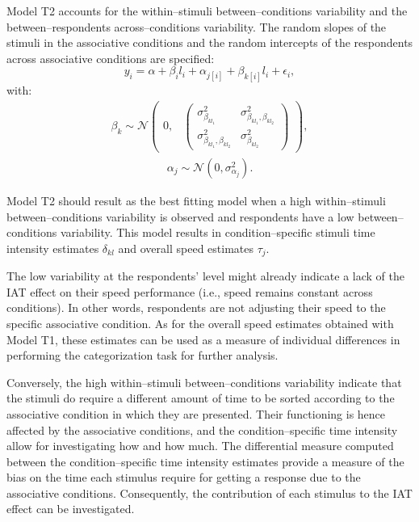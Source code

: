 \documentclass{book}
\begin{document}
Model T2 accounts for the within--stimuli between--conditions variability and the between--respondents across--conditions variability. 
The random slopes of the stimuli in the associative conditions and the random intercepts of the respondents across associative conditions are specified:  
%
\begin{equation}\label{Logtime2}
	y_{i} = \alpha + \beta_il_i + \alpha_{j[i]} +  \beta_{k[i]}l_{i} + \epsilon_{i},
\end{equation}
with:
\begin{align}
	\beta_{k} \sim  \mathcal{N}
	\begin{pmatrix}
		0,&
		\begin{pmatrix}
			\sigma_{\beta_{kl_1}}^2 & \sigma_{\beta_ {kl_1}, \beta_{kl_2}}^2 \\
			\sigma_{{\beta_{kl_1}}, \beta_{kl_2}}^2& \sigma_{\beta_{kl_2}}^2
		\end{pmatrix}
	\end{pmatrix},
\end{align}
\begin{align}
	\alpha_{j} \sim  \mathcal{N} (0, \sigma_{\alpha_j}^2). 
\end{align}

Model T2 should result as the best fitting model when a high within--stimuli between--conditions variability is observed and respondents have a low between--conditions variability. This model results in condition--specific stimuli time intensity estimates $\delta_{kl}$ and overall speed estimates $\tau_{j}$.

The low variability at the respondents' level might already indicate a lack of the IAT effect on their speed performance (i.e., speed remains constant across conditions). In other words, respondents are not adjusting their speed to the specific associative condition. As for the overall speed estimates obtained with Model T1, these estimates can be used as a measure of individual differences in performing the categorization task for further analysis.

Conversely, the high within--stimuli between--conditions variability indicate that the stimuli do require a different amount of time to be sorted according to the associative condition in which they are presented. Their functioning is hence affected by the associative conditions, and the condition--specific time intensity allow for investigating how and how much. 
The differential measure computed between the condition--specific time intensity estimates provide a measure of the bias on the time each stimulus require for getting a response due to the associative conditions. Consequently, the contribution of each stimulus to the IAT effect can be investigated. 
\end{document}
